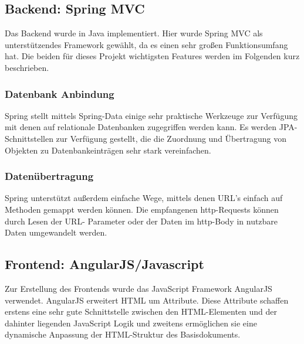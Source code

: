 \subsection{Backend: Spring MVC}
Das Backend wurde in Java implementiert. Hier wurde Spring MVC als unterstützendes Framework gewählt, da es einen sehr großen Funktionsumfang hat. Die beiden für dieses Projekt wichtigsten Features werden im Folgenden kurz beschrieben.

\subsubsection{Datenbank Anbindung}
Spring stellt mittels Spring-Data einige sehr praktische Werkzeuge zur Verfügung mit denen auf relationale Datenbanken zugegriffen werden kann. Es werden JPA-Schnittstellen zur Verfügung gestellt, die die Zuordnung und Übertragung von Objekten zu Datenbankeinträgen sehr stark vereinfachen.

\subsubsection{Datenübertragung}
Spring unterstützt außerdem einfache Wege, mittels denen URL's einfach auf Methoden gemappt werden können. Die empfangenen http-Requests können durch Lesen der URL- Parameter oder der Daten im http-Body in nutzbare Daten umgewandelt werden.

\subsection{Frontend: AngularJS/Javascript}
Zur Erstellung des Frontends wurde das JavaScript Framework AngularJS verwendet. AngularJS erweitert HTML um Attribute. Diese Attribute schaffen erstens eine sehr gute Schnittstelle zwischen den HTML-Elementen und der dahinter liegenden JavaScript Logik und zweitens ermöglichen sie eine dynamische Anpassung der HTML-Struktur des Basisdokuments.
